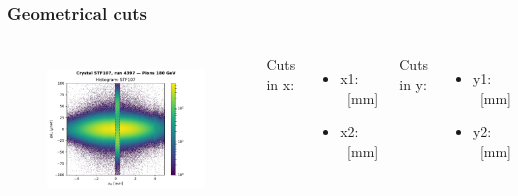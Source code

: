 \documentclass[10pt]{beamer}
\begin{document}
% 
% 
% 


\begin{frame}
\frametitle{Geometrical cuts}


\begin{columns}[c] %

\begin{figure}
\includegraphics[width=\linewidth]{geocuts.pdf}\\
\end{figure}

Cuts in x:
\begin{itemize}[leftmargin=*]
 \item x1: \xmin\ [mm]
 \item x2: \xmax\ [mm]
\end{itemize}
Cuts in y:
\begin{itemize}[leftmargin=*]
 \item y1: \ymin\ [mm]
 \item y2: \ymax\ [mm]
\end{itemize}

\end{columns}
\end{frame}
\end{document}
